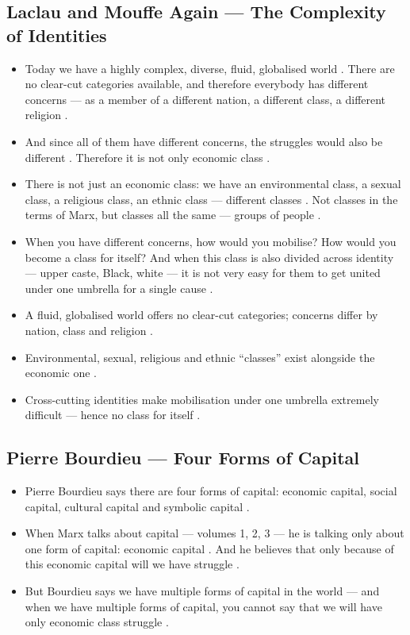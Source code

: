 \subsection{Laclau and Mouffe Again --- The Complexity of Identities}
\begin{itemize}
    \item Today we have a highly complex, diverse, fluid, globalised world . There are no clear-cut categories available, and therefore everybody has different concerns --- as a member of a different nation, a different class, a different religion .
    \item And since all of them have different concerns, the struggles would also be different . Therefore it is not only economic class .
    \item There is not just an economic class: we have an environmental class, a sexual class, a religious class, an ethnic class --- different classes . Not classes in the terms of Marx, but classes all the same --- groups of people .
    \item When you have different concerns, how would you mobilise? How would you become a class for itself?  And when this class is also divided across identity --- upper caste, Black, white --- it is not very easy for them to get united under one umbrella for a single cause .
\end{itemize}

\begin{QuickRevision}
\begin{itemize}
    \item A fluid, globalised world offers no clear-cut categories; concerns differ by nation, class and religion .
    \item Environmental, sexual, religious and ethnic ``classes'' exist alongside the economic one .
    \item Cross-cutting identities make mobilisation under one umbrella extremely difficult --- hence no class for itself .
\end{itemize}
\end{QuickRevision}

\subsection{Pierre Bourdieu --- Four Forms of Capital}
\begin{itemize}
    \item Pierre Bourdieu says there are four forms of capital: economic capital, social capital, cultural capital and symbolic capital .
    \item When Marx talks about capital --- volumes 1, 2, 3 --- he is talking only about one form of capital: economic capital . And he believes that only because of this economic capital will we have struggle .
    \item But Bourdieu says we have multiple forms of capital in the world --- and when we have multiple forms of capital, you cannot say that we will have only economic class struggle .
\end{itemize}

